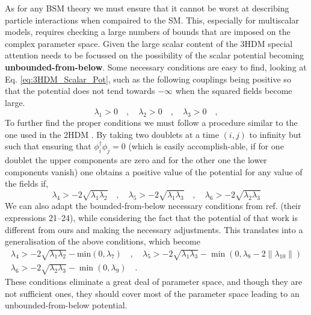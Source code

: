 As for any BSM theory we must ensure that it cannot be worst at describing particle interactions when compaired to the SM. This, especially for multiscalar models, requires checking a large numbers of bounds that are imposed on the complex parameter space. 
%
%
Given the large scalar content of the 3HDM special attention needs to be focussed on the possibility of the scalar potential becoming \textbf{unbounded-from-below}.
% 
Some necessary conditions are easy to find, looking at Eq. \ref{eq:3HDM_Scalar_Pot}, such as the following couplings being positive so that the potential does not tend towards $-\infty$ when the squared fields become large. 
%
\begin{equation}
\lambda_1 > 0  \quad , \quad \lambda_2 > 0 \quad , \quad \lambda_3 > 0 \quad , 
\end{equation}
%
To further find the proper conditions we must follow a procedure similar to the one used in the 2HDM \cite{Branco_1996}. By taking two doublets at a time $(i, j)$ to infinity but such that ensuring that $\phi_i^\dagger \phi_j = 0$ (which is easily accomplish-able, if for one doublet the upper components are zero and for the other one the lower components vanish) one obtains a positive value of the potential for any value of the fields if,
%
\begin{equation}
\lambda_4 > -2 \sqrt{\lambda_1 \lambda_2} \quad , \quad \lambda_5 > -2 \sqrt{\lambda_1 \lambda_3} \quad , \quad \lambda_6 > -2 \sqrt{\lambda_2 \lambda_3}
\end{equation}
%
We can also adapt the bounded-from-below necessary conditions from ref. \cite{Moretti_2015} (their expressions 21–24), while considering the fact that the potential of that work is different from ours and making the necessary adjustments. 
%
This translates into a generalisation of the above conditions, which become
%
\begin{equation}
\begin{gathered}
\lambda_4 > - 2 \sqrt{\lambda_1 \lambda_2} - \text{min}(0,\lambda_7) \quad , \quad  \lambda_5 > -2 \sqrt{\lambda_1 \lambda_3} - \min(0,\lambda_8 - 2\|\lambda_{10}\|)  \\
\lambda_6 > - 2 \sqrt{\lambda_2 \lambda_3} - \min(0,\lambda_9) \quad . 
\end{gathered} 
\end{equation}
%
These conditions eliminate a great deal of parameter space, and though they are not sufficient ones, they should cover most of the parameter space leading to an unbounded-from-below potential.

